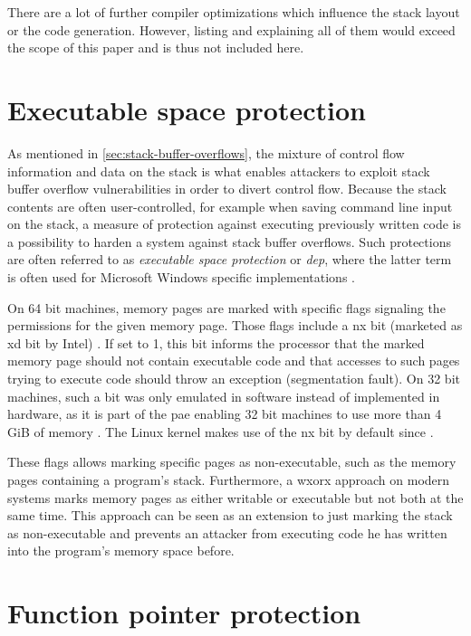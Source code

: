 There are a lot of further compiler optimizations which influence the stack layout or the code generation.
However, listing and explaining all of them would exceed the scope of this paper and is thus not included here.

\section{Executable space protection}
\label{sec:executable-space-protection}

As mentioned in \cref{sec:stack-buffer-overflows}, the mixture of control flow information and data on the stack is what enables attackers to exploit stack buffer overflow vulnerabilities in order to divert control flow.
Because the stack contents are often user-controlled, for example when saving command line input on the stack, a measure of protection against executing previously written code is a possibility to harden a system against stack buffer overflows.
Such protections are often referred to as \emph{executable space protection} or \emph{\gls{dep}}, where the latter term is often used for Microsoft Windows specific implementations \cite{Satran2018}.

On 64 bit machines, memory pages are marked with specific flags signaling the permissions for the given memory page.
Those flags include a \gls{nx} bit (marketed as \gls{xd} bit by Intel) \cite[801\psq]{Bryant2011}.
If set to 1, this bit informs the processor that the marked memory page should not contain executable code and that accesses to such pages trying to execute code should throw an exception (segmentation fault).
On 32 bit machines, such a bit was only emulated in software instead of implemented in hardware, as it is part of the \gls{pae} enabling 32 bit machines to use more than 4 GiB of memory \cite{Molnar2004}.
The Linux kernel makes use of the \gls{nx} bit by default since \citeyear{Cook2010} \cite{Cook2010}.

These flags allows marking specific pages as non-executable, such as the memory pages containing a program's stack.
Furthermore, a \gls{wxorx} approach on modern systems marks memory pages as either writable or executable but not both at the same time.
This approach can be seen as an extension to just marking the stack as non-executable and prevents an attacker from executing code he has written into the program's memory space before.

\section{Function pointer protection}
\label{sec:function-pointer-protection}

